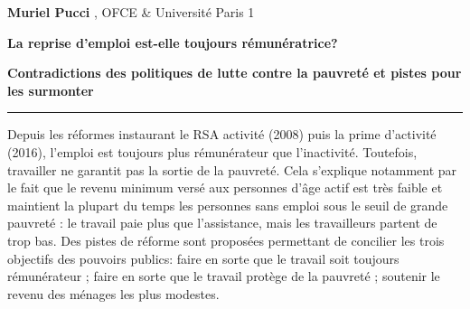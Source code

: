 \documentclass[
  french,
]{article}
\begin{document}
\begin{titlepage}
\begin{minipage}{12.5cm}
        \vspace{2mm}
       \textbf{Muriel Pucci}
         ,
             OFCE \& Université Paris 1
           
        \vspace{2mm}
 \end{minipage}

\newpage
\pagestyle{empty}
\newpage
\pagestyle{empty}

\LARGE\textbf{La reprise d'emploi est-elle toujours rémunératrice?}

\large\textbf{Contradictions des politiques de lutte contre la pauvreté
et pistes pour les surmonter}

\vspace{1cm}


\par\rule{\textwidth}{0.5pt}

Depuis les réformes instaurant le RSA activité (2008) puis la prime
d'activité (2016), l'emploi est toujours plus rémunérateur que
l'inactivité. Toutefois, travailler ne garantit pas la sortie de la
pauvreté. Cela s'explique notamment par le fait que le revenu minimum
versé aux personnes d'âge actif est très faible et maintient la plupart
du temps les personnes sans emploi sous le seuil de grande pauvreté : le
travail paie plus que l'assistance, mais les travailleurs partent de
trop bas. Des pistes de réforme sont proposées permettant de concilier
les trois objectifs des pouvoirs publics: faire en sorte que le travail
soit toujours rémunérateur ; faire en sorte que le travail protège de la
pauvreté ; soutenir le revenu des ménages les plus modestes.


\end{titlepage}
\end{document}
